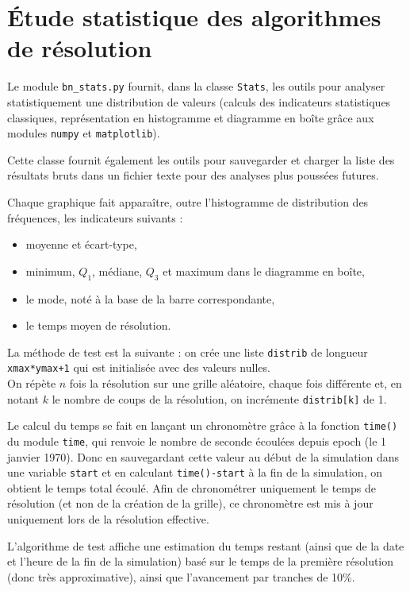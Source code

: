 \chapter{Étude statistique des algorithmes de résolution}\label{annexe_stats}
Le module \texttt{bn\_stats.py} fournit, dans la classe \texttt{Stats}, les outils pour analyser statistiquement une distribution de valeurs (calculs des indicateurs statistiques classiques, représentation en histogramme et diagramme en boîte grâce aux modules \texttt{numpy} et \texttt{matplotlib}).

Cette classe fournit également les outils pour sauvegarder et charger la liste des résultats bruts dans un fichier texte pour des analyses plus poussées futures.

Chaque graphique fait apparaître, outre l'histogramme de distribution des fréquences, les indicateurs suivants :
\begin{itemize}
\item moyenne et écart-type,
\item minimum, $Q_1$, médiane, $Q_3$ et maximum dans le diagramme en boîte,
\item le mode, noté à la base de la barre correspondante,
\item le temps moyen de résolution.
\end{itemize}

\medskip

La méthode de test est la suivante : on crée une liste \texttt{distrib} de longueur \texttt{xmax*ymax+1} qui est initialisée avec des valeurs nulles.\\
On répète $n$ fois la résolution sur une grille aléatoire, chaque fois différente et, en notant $k$ le nombre de coups de la résolution, on incrémente \texttt{distrib[k]} de 1.

\medskip

Le calcul du temps se fait en lançant un chronomètre grâce à la fonction \texttt{time()} du module \texttt{time}, qui renvoie le nombre de seconde écoulées depuis epoch (le 1 janvier 1970). Donc en sauvegardant cette valeur au début de la simulation dans une variable \texttt{start} et en calculant \texttt{time()-start} à la fin de la simulation, on obtient le temps total écoulé. Afin de chronométrer uniquement le temps de résolution (et non de la création de la grille), ce chronomètre est mis à jour uniquement lors de la résolution effective.

L'algorithme de test affiche une estimation du temps restant (ainsi que de la date et l'heure de la fin de la simulation) basé sur le temps de la première résolution (donc très approximative), ainsi que l'avancement par tranches de 10\%.

